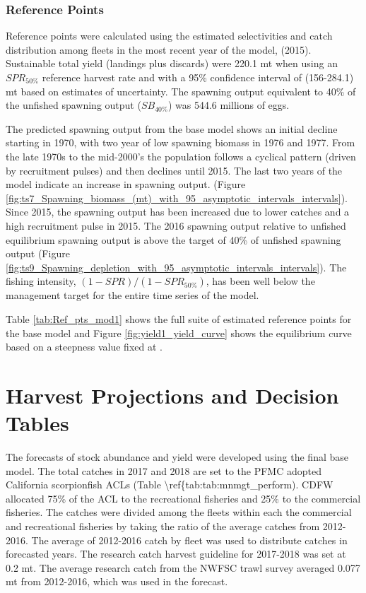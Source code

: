 \documentclass[12pt,]{article}
\begin{document}
\subsubsection{Reference Points}\label{reference-points-1}

Reference points were calculated using the estimated selectivities and
catch distribution among fleets in the most recent year of the model,
(2015). Sustainable total yield (landings plus discards) were 220.1 mt
when using an \(SPR_{50\%}\) reference harvest rate and with a 95\%
confidence interval of (156-284.1) mt based on estimates of uncertainty.
The spawning output equivalent to 40\% of the unfished spawning output
(\(SB_{40\%}\)) was 544.6 millions of eggs.

The predicted spawning output from the base model shows an initial
decline starting in 1970, with two year of low spawning biomass in 1976
and 1977. From the late 1970s to the mid-2000's the population follows a
cyclical pattern (driven by recruitment pulses) and then declines until
2015. The last two years of the model indicate an increase in spawning
output. (Figure
\ref{fig:ts7_Spawning_biomass_(mt)_with_95_asymptotic_intervals_intervals}).
Since 2015, the spawning output has been increased due to lower catches
and a high recruitment pulse in 2015. The 2016 spawning output relative
to unfished equilibrium spawning output is above the target of 40\% of
unfished spawning output (Figure
\ref{fig:ts9_Spawning_depletion_with_95_asymptotic_intervals_intervals}).
The fishing intensity, \((1-SPR)/(1-SPR_{50\%})\), has been well below
the management target for the entire time series of the model.

Table \ref{tab:Ref_pts_mod1} shows the full suite of estimated reference
points for the base model and Figure \ref{fig:yield1_yield_curve} shows
the equilibrium curve based on a steepness value fixed at .

\section{Harvest Projections and Decision
Tables}\label{harvest-projections-and-decision-tables}

The forecasts of stock abundance and yield were developed using the
final base model. The total catches in 2017 and 2018 are set to the PFMC
adopted California scorpionfish ACLs (Table
\textbackslash{}ref\{tab:tab:mnmgt\_perform). CDFW allocated 75\% of the
ACL to the recreational fisheries and 25\% to the commercial fisheries.
The catches were divided among the fleets within each the commercial and
recreational fisheries by taking the ratio of the average catches from
2012-2016. The average of 2012-2016 catch by fleet was used to
distribute catches in forecasted years. The research catch harvest
guideline for 2017-2018 was set at 0.2 mt. The average research catch
from the NWFSC trawl survey averaged 0.077 mt from 2012-2016, which was
used in the forecast.
\end{document}
